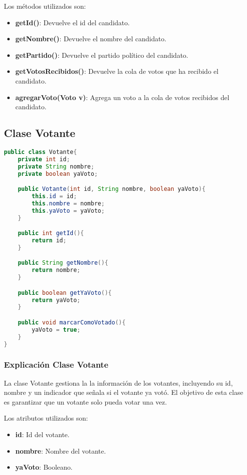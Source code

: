 \documentclass[12pt]{article}
\begin{document}
Los métodos utilizados son:
\begin{itemize}
    \item \textbf{getId()}: Devuelve el id del candidato.
    \item \textbf{getNombre()}: Devuelve el nombre del candidato.
    \item \textbf{getPartido()}: Devuelve el partido político del candidato.
    \item \textbf{getVotosRecibidos()}: Devuelve la cola de votos que ha recibido el candidato.
    \item \textbf{agregarVoto(Voto v)}: Agrega un voto a la cola de votos recibidos del candidato.
\end{itemize}
\pagebreak

\subsection{Clase Votante}
\begin{lstlisting}[language=Java,style=mystyle]
public class Votante{
    private int id;
    private String nombre;
    private boolean yaVoto;

    public Votante(int id, String nombre, boolean yaVoto){
        this.id = id;
        this.nombre = nombre;
        this.yaVoto = yaVoto;
    }

    public int getId(){
        return id;
    }

    public String getNombre(){
        return nombre;
    }

    public boolean getYaVoto(){
        return yaVoto;
    }

    public void marcarComoVotado(){
        yaVoto = true;
    }
}
\end{lstlisting}
\pagebreak

\subsubsection{Explicación Clase Votante}

La clase Votante gestiona la la información de los votantes, incluyendo su id, nombre y un indicador que señala si el votante ya votó. El objetivo de esta clase es garantizar que un votante solo pueda votar una vez. 

Los atributos utilizados son:
\begin{itemize}
    \item \textbf{id}: Id del votante.
    \item \textbf{nombre}: Nombre del votante.
    \item \textbf{yaVoto}: Booleano.
\end{itemize}
\end{document}
